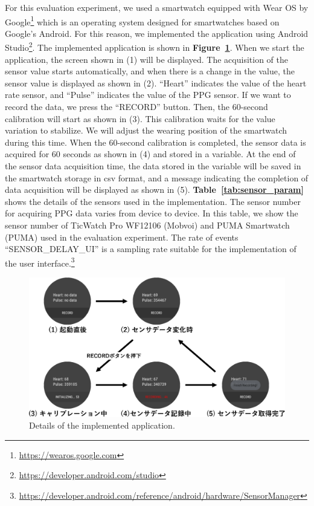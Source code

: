 \documentclass[sigchi,authordraft]{acmart}
\newcommand\figref[1]{\textbf{Figure~\ref{fig:#1}}}
\newcommand\tabref[1]{\textbf{Table~\ref{tab:#1}}}
\begin{document}
For this evaluation experiment, we used a smartwatch equipped with Wear OS by Google\footnote{\url{https://wearos.google.com}} which is an operating system designed for smartwatches based on Google's Android. For this reason, we implemented the application using Android Studio\footnote{\url{https://developer.android.com/studio}}. The implemented application is shown in \figref{app}. When we start the application, the screen shown in (1) will be displayed. The acquisition of the sensor value starts automatically, and when there is a change in the value, the sensor value is displayed as shown in (2). ``Heart'' indicates the value of the heart rate sensor, and ``Pulse'' indicates the value of the PPG sensor. If we want to record the data, we press the ``RECORD'' button. Then, the 60-second calibration will start as shown in (3). This calibration waits for the value variation to stabilize. We will adjust the wearing position of the smartwatch during this time. When the 60-second calibration is completed, the sensor data is acquired for 60 seconds as shown in (4) and stored in a variable. At the end of the sensor data acquisition time, the data stored in the variable will be saved in the smartwatch storage in csv format, and a message indicating the completion of data acquisition will be displayed as shown in (5). \tabref{sensor_param} shows the details of the sensors used in the implementation. The sensor number for acquiring PPG data varies from device to device. In this table, we show the sensor number of TicWatch Pro WF12106 (Mobvoi) and PUMA Smartwatch (PUMA) used in the evaluation experiment. The rate of events ``SENSOR\_DELAY\_UI'' is a sampling rate suitable for the implementation of the user interface.\footnote{\url{https://developer.android.com/reference/android/hardware/SensorManager}}

\begin{figure}[!t]
  \centering
  \includegraphics[width=1\linewidth]{figures/app.eps}
  \caption{Details of the implemented application.}
  \label{fig:app}
\end{figure}
\end{document}
